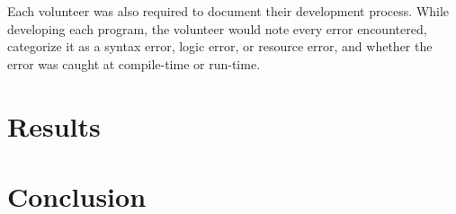 \documentclass[draftcopy]{srpaper}
\begin{document}
Each volunteer was also required to document their development process. While
developing each program, the volunteer would note every error encountered,
categorize it as a syntax error, logic error, or resource error, and whether
the error was caught at compile-time or run-time.

\chapter{Results}

\chapter{Conclusion}

\nocite{*}

\end{document}

